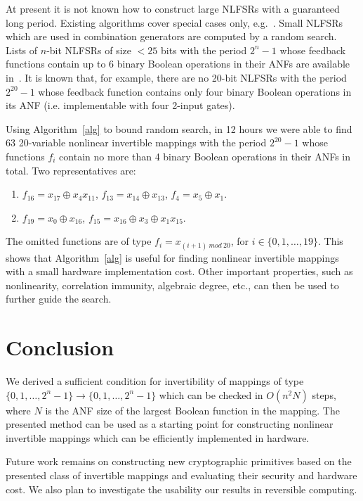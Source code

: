 \documentclass[9pt,conference]{IEEEtran} \usepackage{times}
\begin{document}
At present it is not known how to construct large NLFSRs with a guaranteed long period.
Existing algorithms cover special cases only, e.g.~\cite{Du12a,Du13a}. 
Small NLFSRs which are used in combination generators are computed by a random search.
Lists of $n$-bit NLFSRs of size $< 25$ bits with the period $2^n-1$ whose feedback functions contain up to 6 binary Boolean operations in their ANFs are available in~\cite{Du12l}. 
It is known that, for example, there are no 20-bit NLFSRs with the period $2^{20}-1$ whose feedback function contains only 
four binary Boolean operations in its ANF (i.e. implementable with four 2-input gates).

Using Algorithm~\ref{alg} to bound random search, in 12 hours we were able to find 63 20-variable nonlinear invertible mappings with the period $2^{20}-1$ whose functions $f_i$ contain no more than 4 binary Boolean operations in their ANFs in total. Two representatives are:

\begin{enumerate}
\item  $f_{16} = x_{17} \oplus x_4 x_{11}$, $f_{13} = x_{14} \oplus x_{13}$, $f_4 = x_5 \oplus x_1$. \vspace{1mm}
\item  $f_{19} = x_{0} \oplus x_{16}$, $f_{15} = x_{16} \oplus x_{3} \oplus x_1 x_{15}$.
\end{enumerate}
The omitted functions are of type $f_i = x_{(i+1)~mod~20}$, for $i \in \{0,1,\ldots,19\}$. 
This shows that Algorithm~\ref{alg} is useful for finding nonlinear invertible 
mappings with a small hardware implementation cost.
Other important properties, such as nonlinearity, correlation immunity, algebraic degree, etc., can then be used to further guide the search.

\section{Conclusion} \label{conc}

We derived a sufficient condition for invertibility of mappings of type $\{0,1,\ldots,2^n-1\} \rightarrow \{0,1,\ldots,2^n-1\}$ which can be checked in $O(n^2 N)$ steps, where $N$ 
is the ANF size of the largest Boolean function in the mapping.
The presented method can be used as a starting point for
constructing nonlinear invertible mappings which can be efficiently implemented in hardware.

Future work remains on constructing new cryptographic primitives based on the presented class of invertible mappings and evaluating their security and hardware cost. We also plan to investigate the usability our results in reversible computing.
\end{document}
